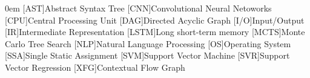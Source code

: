 \begin{acronym}[LSTM]\itemsep0em
    [AST]{Abstract Syntax Tree}
    [CNN]{Convolutional Neural Netoworks}
    [CPU]{Central Processing Unit}
    [DAG]{Directed Acyclic Graph}
    [I/O]{Input/Output}
    [IR]{Intermediate Representation}
    [LSTM]{Long short-term memory}
    [MCTS]{Monte Carlo Tree Search}
    [NLP]{Natural Language Processing}
    [OS]{Operating System}
    [SSA]{Single Static Assignment}
    [SVM]{Support Vector Machine}
    [SVR]{Support Vector Regression}
    [XFG]{Contextual Flow Graph}
\end{acronym}
